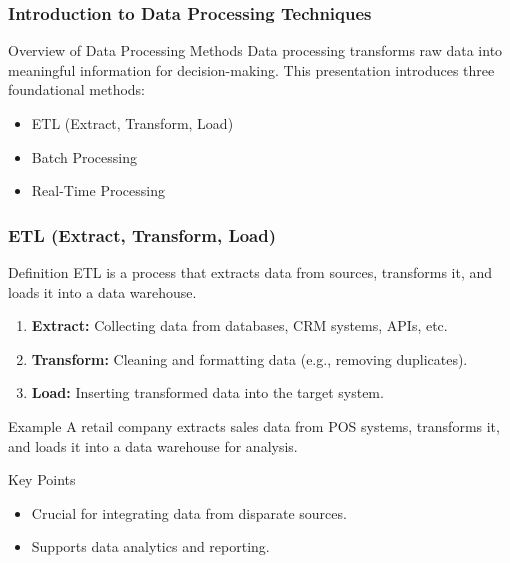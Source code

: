 \documentclass[aspectratio=169]{beamer}
\begin{document}
\frame{\titlepage}

\begin{frame}[fragile]
    \frametitle{Introduction to Data Processing Techniques}
    \begin{block}{Overview of Data Processing Methods}
        Data processing transforms raw data into meaningful information for decision-making. This presentation introduces three foundational methods: 
        \begin{itemize}
            \item ETL (Extract, Transform, Load)
            \item Batch Processing
            \item Real-Time Processing
        \end{itemize}
    \end{block}
\end{frame}

\begin{frame}[fragile]
    \frametitle{ETL (Extract, Transform, Load)}
    \begin{block}{Definition}
        ETL is a process that extracts data from sources, transforms it, and loads it into a data warehouse.
    \end{block}
    \begin{enumerate}
        \item \textbf{Extract:} Collecting data from databases, CRM systems, APIs, etc.
        \item \textbf{Transform:} Cleaning and formatting data (e.g., removing duplicates).
        \item \textbf{Load:} Inserting transformed data into the target system.
    \end{enumerate}
    \begin{block}{Example}
        A retail company extracts sales data from POS systems, transforms it, and loads it into a data warehouse for analysis.
    \end{block}
    \begin{block}{Key Points}
        \begin{itemize}
            \item Crucial for integrating data from disparate sources.
            \item Supports data analytics and reporting.
        \end{itemize}
    \end{block}
\end{frame}
\end{document}
